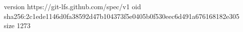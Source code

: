 version https://git-lfs.github.com/spec/v1
oid sha256:2c1ede1146d0fa38592d47b104373f5e0405b0f530eec6d491a676168182e305
size 1273
